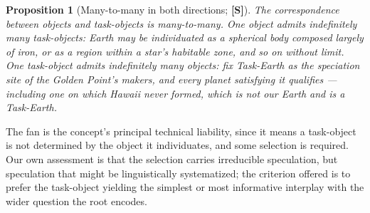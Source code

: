 \documentclass[11pt]{article}
\numberwithin{equation}{section}
\theoremstyle{plain}
\newtheorem{proposition}[theorem]{Proposition}
\theoremstyle{definition}
\theoremstyle{remark}
\begin{document}
\begin{proposition}[Many-to-many in both directions; \textbf{[S]}]
\label{to:prop:fan}
The correspondence between objects and task-objects is many-to-many.
One object admits indefinitely many task-objects: Earth may be
individuated as a spherical body composed largely of iron, or as a
region within a star's habitable zone, and so on without limit. One
task-object admits indefinitely many objects: fix Task-Earth as the
speciation site of the Golden Point's makers, and every planet
satisfying it qualifies --- including one on which Hawaii never formed,
which is not our Earth and is a Task-Earth.
\end{proposition}

The fan is the concept's principal technical liability, since it means a
task-object is not determined by the object it individuates, and some
selection is required. Our own assessment is that the
selection carries irreducible speculation, but speculation that might be
linguistically systematized; the criterion offered is to prefer the
task-object yielding the simplest or most informative interplay with the
wider question the root encodes.
\end{document}

